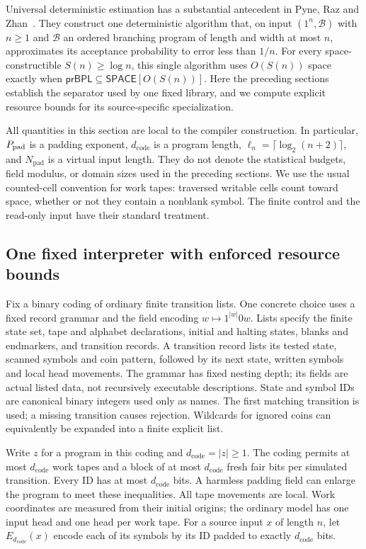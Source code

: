 Universal deterministic estimation has a substantial antecedent in
Pyne, Raz and Zhan~\cite[full version, Theorem~5.1]{PyneRazZhan2023}.
They construct one deterministic algorithm that, on input $(1^n,\mathcal B)$
with $n\ge1$ and $\mathcal B$ an ordered branching program of length
and width at most $n$, approximates its acceptance probability to error less than
$1/n$. For every space-constructible $S(n)\ge\log n$, this single
algorithm uses $O(S(n))$ space exactly when
$\mathsf{prBPL}\subseteq\mathsf{SPACE}[O(S(n))]$.
Here the preceding sections establish the separator used by one fixed
library, and we compute explicit resource bounds for its source-specific
specialization.

All quantities in this section are local to the compiler construction.
In particular, ${P_{\rm pad}}$ is a padding exponent, $d_{\mathrm{code}}$ is a program
length, $\ell_n=\lceil\log_2(n+2)\rceil$, and $N_{\mathrm{pad}}$ is a virtual
input length.  They do not denote the statistical budgets, field modulus,
or domain sizes used in the preceding sections.  We use the usual
counted-cell convention for work tapes: traversed writable cells count
toward space, whether or not they contain a nonblank symbol.  The finite
control and the read-only input have their standard treatment.

\subsection{One fixed interpreter with enforced resource bounds}
\label{subsec:compiler-interpreter}

Fix a binary coding of ordinary finite transition lists.  One concrete
choice uses a fixed record grammar and the field encoding
$w\mapsto 1^{|w|}0w$.  Lists specify the finite state set, tape and
alphabet declarations, initial and halting states, blanks and endmarkers,
and transition records.  A transition record lists its tested state,
scanned symbols and coin pattern, followed by its next state, written
symbols and local head movements.  The grammar has fixed nesting depth;
its fields are actual listed data, not recursively executable descriptions.
State and symbol IDs are canonical binary integers used only as names.
The first matching transition is
used; a missing transition causes rejection.  Wildcards for ignored coins
can equivalently be expanded into a finite explicit list.

Write $z$ for a program in this coding and
$d_{\mathrm{code}}=|z|\ge1$.  The coding permits at most
$d_{\mathrm{code}}$ work tapes and a block of at most
$d_{\mathrm{code}}$ fresh fair bits per simulated transition.  Every ID
has at most $d_{\mathrm{code}}$ bits.  A harmless padding field can enlarge
the program to meet these inequalities.  All tape movements are local.
Work coordinates are measured from their initial origins; the ordinary
model has one input head and one head per work tape.  For a source input
$x$ of length $n$, let $E_{d_{\mathrm{code}}}(x)$ encode each of its
symbols by its ID padded to exactly $d_{\mathrm{code}}$ bits.


